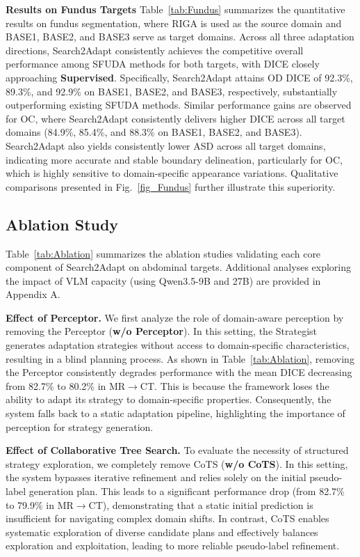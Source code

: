 \documentclass[sigconf, screen]{acmart}
\begin{document}
\textbf{Results on Fundus Targets}
Table~\ref{tab:Fundus} summarizes the quantitative results on fundus segmentation, where RIGA is used as the source domain and BASE1, BASE2, and BASE3 serve as target domains. Across all three adaptation directions, Search2Adapt consistently achieves the competitive overall performance among SFUDA methods for both targets, with DICE closely approaching \textbf{Supervised}. Specifically, Search2Adapt attains OD DICE of 92.3\%, 89.3\%, and 92.9\% on BASE1, BASE2, and BASE3, respectively, substantially outperforming existing SFUDA methods. Similar performance gains are observed for OC, where Search2Adapt consistently delivers higher DICE across all target domains (84.9\%, 85.4\%, and 88.3\% on BASE1, BASE2, and BASE3). Search2Adapt also yields consistently lower ASD across all target domains, indicating more accurate and stable boundary delineation, particularly for OC, which is highly sensitive to domain-specific appearance variations. Qualitative comparisons presented in Fig.~\ref{fig_Fundus} further illustrate this superiority.%
\subsection{Ablation Study}
Table~\ref{tab:Ablation} summarizes the ablation studies validating each core component of Search2Adapt on abdominal targets. Additional analyses exploring the impact of VLM capacity (using Qwen3.5-9B and 27B) are provided in Appendix A.

\textbf{Effect of Perceptor.}
We first analyze the role of domain-aware perception by removing the Perceptor (\textbf{w/o Perceptor}). In this setting, the Strategist generates adaptation strategies without access to domain-specific characteristics, resulting in a blind planning process. As shown in Table~\ref{tab:Ablation}, removing the Perceptor consistently degrades performance with the mean DICE decreasing from 82.7\% to 80.2\% in MR$\rightarrow$CT. This is because the framework loses the ability to adapt its strategy to domain-specific properties. Consequently, the system falls back to a static adaptation pipeline, highlighting the importance of perception for strategy generation.

\textbf{Effect of Collaborative Tree Search.}
To evaluate the necessity of structured strategy exploration, we completely remove CoTS (\textbf{w/o CoTS}). In this setting, the system bypasses iterative refinement and relies solely on the initial pseudo-label generation plan. This leads to a significant performance drop (from 82.7\% to 79.9\% in MR$\rightarrow$CT), demonstrating that a static initial prediction is insufficient for navigating complex domain shifts. In contrast, CoTS enables systematic exploration of diverse candidate plans and effectively balances exploration and exploitation, leading to more reliable pseudo-label refinement.
\end{document}
